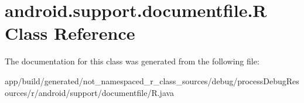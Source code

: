 \hypertarget{classandroid_1_1support_1_1documentfile_1_1_r}{}\section{android.\+support.\+documentfile.\+R Class Reference}
\label{classandroid_1_1support_1_1documentfile_1_1_r}


The documentation for this class was generated from the following file\+:\begin{DoxyCompactItemize}
\item 
app/build/generated/not\+\_\+namespaced\+\_\+r\+\_\+class\+\_\+sources/debug/process\+Debug\+Resources/r/android/support/documentfile/R.\+java\end{DoxyCompactItemize}
